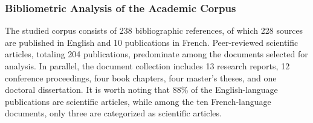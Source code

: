 \begin{refsegment}
\subsubsection*{Bibliometric Analysis of the Academic Corpus
    \label{chap2:analyse-bibliometrique}
    }

The studied corpus consists of 238 bibliographic references, of which 228 sources are published in English and 10 publications in French. Peer-reviewed scientific articles, totaling 204 publications, predominate among the documents selected for analysis. In parallel, the document collection includes 13 research reports, 12 conference proceedings, four book chapters, four master's theses, and one doctoral dissertation. It is worth noting that 88\% of the English-language publications are scientific articles, while among the ten French-language documents, only three are categorized as scientific articles.%


\end{refsegment}
